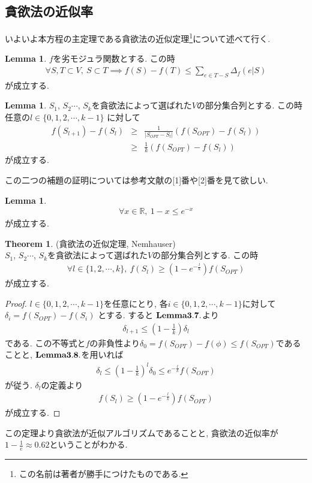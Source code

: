 \documentclass[11pt, a4paper, dvipdfmx]{jsarticle}
\theoremstyle{definition}
\newtheorem{Theorem+}[Axiom+]{Theorem}
\newtheorem{Lemma+}[Axiom+]{Lemma}
\newcommand{\R}{\mathbb{R}}
\begin{document}
\subsection{貪欲法の近似率}
いよいよ本方程の主定理である貪欲法の近似定理\footnote{この名前は著者が勝手につけたものである.}について述べて行く.
\begin{Lemma+}
    $f$を劣モジュラ関数とする. この時
    \begin{align*}
        \forall S, T\subset V,~ S\subset T\implies f(S) - f(T)\leq \sum_{e\in T - S}\Delta_{f}(e|S)
    \end{align*}
    が成立する.
\end{Lemma+}
\begin{Lemma+}
    $S_{1}$, $S_{2}$$\cdots$, $S_{k}$を貪欲法によって選ばれた$V$の部分集合列とする. この時任意の$l\in\{0, 1, 2, \cdots, k - 1\}$
    に対して 
    \begin{eqnarray*}
          f(S_{l + 1}) -f(S_{l})&\geq& \frac{1}{|S_{OPT} - S_{l}|}(f(S_{OPT}) - f(S_{l})) \\
                                                               &\geq& \frac{1}{k}(f(S_{OPT}) - f(S_{l}))
    \end{eqnarray*}
    が成立する.
\end{Lemma+}
この二つの補題の証明については参考文献の[1]番や[2]番を見て欲しい.
\begin{Lemma+}
    \begin{align*}
        \forall x\in\R, ~1 - x\leq e^{-x}
    \end{align*}
    が成立する.
\end{Lemma+}
\begin{Theorem+}(貪欲法の近似定理, Nemhauser)\\
    $S_{1}$, $S_{2}$$\cdots$, $S_{k}$を貪欲法によって選ばれた$V$の部分集合列とする. この時
    \begin{align*}
        \forall l\in\{1, 2, \cdots, k\}, ~f(S_{l}) \geq\left (1 - e^{-\frac{l}{k}}\right)f(S_{OPT})
    \end{align*}
    が成立する. 
    \begin{proof}
         $l\in\{0, 1, 2, \cdots, k - 1\}$を任意にとり, 各$i\in\{0, 1, 2, \cdots, k - 1\}$に対して$\delta_{i} = f(S_{OPT}) - f(S_{i})$ とする. すると
         ${\bf Lemma 3.7.}$より
        \begin{align*}
            \delta_{l+1}\leq\left(1 - \frac{1}{k}\right)\delta_{l}
        \end{align*}
        である. この不等式と$f$の非負性より$\delta_{0} = f(S_{OPT}) - f(\phi)\leq f(S_{OPT})$であることと, ${\bf Lemma 3.8.}$を用いれば
        \begin{align*}
            \delta_{l}\leq \left(1 - \frac{1}{k}\right)^{l}\delta_{0}\leq e^{-\frac{l}{k}}f(S_{OPT})
        \end{align*}
        が従う. $\delta_{l}$の定義より
        \begin{align*}
            f(S_{l}) \geq\left (1 - e^{-\frac{l}{k}}\right)f(S_{OPT})
        \end{align*}
        が成立する.
    \end{proof}
\end{Theorem+}
この定理より貪欲法が近似アルゴリズムであることと, 貪欲法の近似率が $1 - \frac{1}{e} \approx 0.62$ということがわかる.
\end{document}
